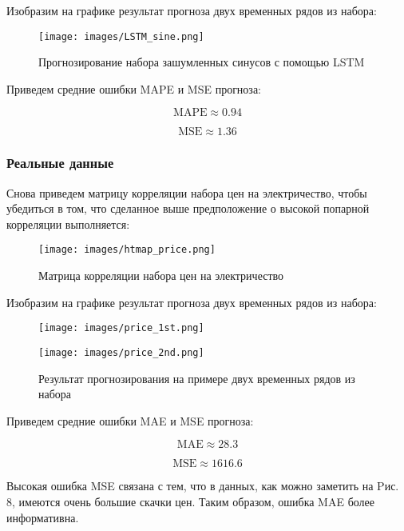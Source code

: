 \documentclass{article}
\begin{document}
\newpage

 Изобразим на графике результат прогноза двух временных рядов из набора:

\begin{figure}[!htbp]
\centering
{\texttt{[image: images/LSTM\_sine.png]} }
\caption{Прогнозирование набора зашумленных синусов с помощью LSTM}
\label{fig:LSTMsine}
\end{figure}

Приведем средние ошибки MAPE и MSE прогноза:

\begin{equation}
    \text{MAPE} \approx 0.94
\end{equation}

\begin{equation}
    \text{MSE} \approx 1.36
\end{equation}

\subsubsection{Реальные данные}

Снова приведем матрицу корреляции набора цен на электричество, чтобы убедиться в том, что сделанное выше предположение о высокой попарной корреляции выполняется:

\begin{figure}[!htbp]
\centering
{\texttt{[image: images/htmap\_price.png]} }
\caption{Матрица корреляции набора цен на электричество}
\label{fig:Heatprice}
\end{figure}

 Изобразим на графике результат прогноза двух временных рядов из набора:

\begin{figure}[h]
  \begin{minipage}{0.5\textwidth}
    \centering
    \texttt{[image: images/price\_1st.png]}
  \end{minipage}\hfill
  \begin{minipage}{0.5\textwidth}
    \centering
    \texttt{[image: images/price\_2nd.png]}
  \end{minipage}
  \caption{Результат прогнозирования на примере двух временных рядов из набора}
\end{figure}

Приведем средние ошибки MAE и MSE прогноза:

\begin{equation}
    \text{MAE} \approx 28.3
\end{equation}

\begin{equation}
    \text{MSE} \approx 1616.6
\end{equation}

Высокая ошибка MSE связана с тем, что в данных, как можно заметить на Pис. 8, имеются очень большие скачки цен. Таким образом, ошибка MAE более информативна.



\end{document}
